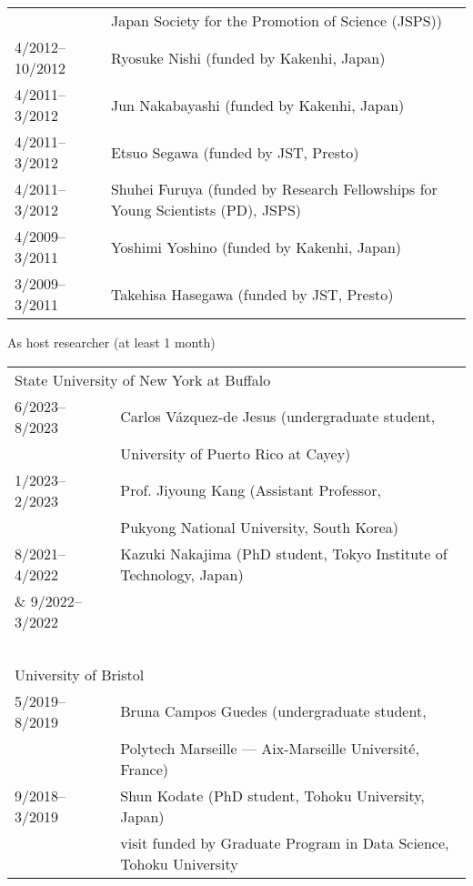 \documentclass[11pt,letter]{article}
\renewenvironment{itemize}{
  \begin{list}{}{
    \setlength{\leftmargin}{1.5em}
    \setlength{\itemsep}{0.25em}
    \setlength{\parskip}{0pt}
    \setlength{\parsep}{0.25em}
  }
}{
  \end{list}
}
\begin{document}
\begin{itemize}
\begin{tabular}{ll}
& Japan Society for the Promotion of Science (JSPS))\\
%
4/2012--10/2012 & Ryosuke Nishi (funded by Kakenhi, Japan)\\
%
4/2011--3/2012 & Jun Nakabayashi (funded by Kakenhi, Japan)\\
%
4/2011--3/2012 & Etsuo Segawa (funded by JST, Presto)\\
%
4/2011--3/2012 & Shuhei Furuya (funded by Research Fellowships for Young Scientists (PD), JSPS)\\
%
4/2009--3/2011 & Yoshimi Yoshino (funded by Kakenhi, Japan)\\
%
3/2009--3/2011 & Takehisa Hasegawa (funded by JST, Presto)
\end{tabular}

\bigskip

\item As host researcher (at least 1 month)

\medskip

\begin{tabular}{ll}
\multicolumn{2}{l}{State University of New York at Buffalo}\\[1.5mm]
6/2023--8/2023 & Carlos V\'{a}zquez-de Jesus (undergraduate student,\\
& University of Puerto Rico at Cayey)\\
%
1/2023--2/2023 & Prof. Jiyoung Kang (Assistant Professor,\\
& Pukyong National University, South Korea)\\
%
8/2021--4/2022 & Kazuki Nakajima (PhD student, Tokyo Institute of Technology, Japan)\\
\& 9/2022--3/2022 & \\
\ \\
\multicolumn{2}{l}{University of Bristol}\\[1.5mm]
5/2019--8/2019 & Bruna Campos Guedes (undergraduate student,\\
& Polytech Marseille --- Aix-Marseille Universit\'{e}, France)\\


9/2018--3/2019 & Shun Kodate (PhD student, Tohoku University, Japan)\\
& visit funded by Graduate Program in Data Science, Tohoku University\\


\end{tabular}
\end{itemize}
\end{document}

